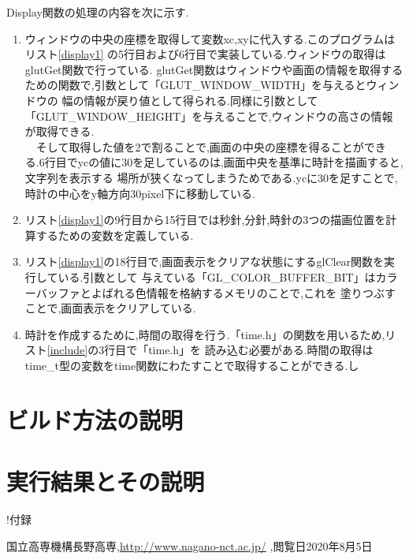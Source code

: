 \documentclass[a4j]{jarticle}
\begin{document}
            Display関数の処理の内容を次に示す.        
            \begin{enumerate}
              \item ウィンドウの中央の座標を取得して変数xc,xyに代入する.このプログラムはリスト\ref{display1}
              の5行目および6行目で実装している.ウィンドウの取得はglutGet関数で行っている.
              glutGet関数はウィンドウや画面の情報を取得するための関数で,引数として「GLUT\_WINDOW\_WIDTH」を与えるとウィンドウの
              幅の情報が戻り値として得られる.同様に引数として「GLUT\_WINDOW\_HEIGHT」を与えることで,ウィンドウの高さの情報
              が取得できる.\\
              　そして取得した値を2で割ることで,画面の中央の座標を得ることができる.6行目でycの値に30を足しているのは,画面中央を基準に時計を描画すると,文字列を表示する
              場所が狭くなってしまうためである.ycに30を足すことで,時計の中心をy軸方向30pixel下に移動している.
              \item リスト\ref{display1}の9行目から15行目では秒針,分針,時針の3つの描画位置を計算するための変数を定義している.
              \item リスト\ref{display1}の18行目で,画面表示をクリアな状態にするglClear関数を実行している.引数として
              与えている「GL\_COLOR\_BUFFER\_BIT」はカラーバッファとよばれる色情報を格納するメモリのことで,これを
              塗りつぶすことで,画面表示をクリアしている.
              \item 時計を作成するために,時間の取得を行う.「time.h」の関数を用いるため,リスト\ref{include}の3行目で「time.h」を
              読み込む必要がある.時間の取得はtime\_t型の変数をtime関数にわたすことで取得することができる.し

            \end{enumerate} 
    \section{ビルド方法の説明}
    \section{実行結果とその説明}

    !付録
        \begin{thebibliography}{9}
            国立高専機構長野高専,\url{http://www.nagano-nct.ac.jp/} ,閲覧日2020年8月5日
          \end{thebibliography}
\end{document}
